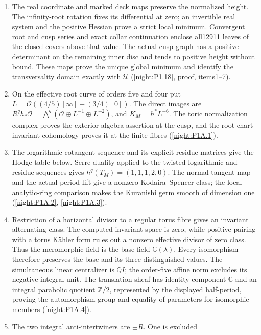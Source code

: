 \begin{enumerate}[label=\arabic*.]
\item The real coordinate and marked deck maps preserve the normalized
  height. The infinity-root rotation fixes its differential at zero;
  an invertible real system and the positive Hessian prove a strict
  local minimum. Convergent root and cusp series and exact collar
  continuation enclose all12911 leaves of the closed covers above
  that value. The actual cusp graph has a positive determinant on
  the remaining inner disc and tends to positive height without
  bound. These maps prove the unique global minimum and identify
  the transversality domain exactly with $\mathcal U$
  (\cref{night:P1.18}, proof, items1--7).
\item On the effective root curve of orders five and four put
  $L=\mathcal O((4/5)[\infty]-(3/4)[0])$.  The direct images are
  $R^qh_*\mathcal O=\bigwedge^q
  (\mathcal O\oplus L^{-1}\oplus L^{-2})$, and
  $K_M=h^*L^{-6}$.  The toric normalization complex proves the
  exterior-algebra assertion at the cusp, and the root-chart
  invariant cohomology proves it at the finite fibres
  (\cref{night:P1A.1}).
\item The logarithmic cotangent sequence and its explicit residue
  matrices give the Hodge table below.  Serre duality applied to
  the twisted logarithmic and residue sequences gives
  $h^q(T_M)=(1,1,1,2,0)$.  The normal tangent map and the actual
  period lift give a nonzero Kodaira--Spencer class; the local
  analytic-ring comparison makes the Kuranishi germ smooth of
  dimension one (\cref{night:P1A.2}, \cref{night:P1A.3}).
\item Restriction of a horizontal divisor to a regular torus fibre
  gives an invariant alternating class.  The computed invariant
  space is zero, while positive pairing with a torus Kähler form
  rules out a nonzero effective divisor of zero class.  Thus the
  meromorphic field is the base field $\mathbb C(\lambda)$.
  Every isomorphism therefore preserves the base and its three
  distinguished values.  The simultaneous linear centralizer is
  $\mathbb Q I$; the order-five affine norm excludes its negative
  integral unit.  The translation sheaf has identity component
  $\mathbb C$ and an integral parabolic quotient $\mathbb Z/2$,
  represented by the displayed half-period, proving the
  automorphism group and equality of parameters for isomorphic
  members (\cref{night:P1A.4}).
\item The two integral anti-intertwiners are $\pm R$.  One is excluded

\end{enumerate}
